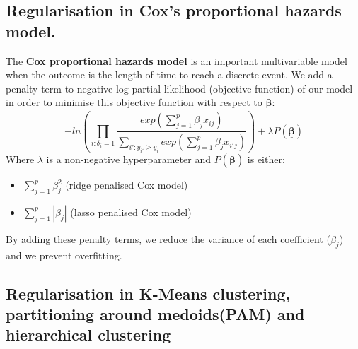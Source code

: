 \documentclass[12pt]{article}
\begin{document}
\subsection*{Regularisation in Cox's proportional hazards model.}
The \textbf{Cox proportional hazards model} is an important multivariable model when the outcome is the length of time to reach a discrete event. We add a penalty term to negative log partial likelihood (objective function)
of our model in order to minimise this objective function with respect to $\boldsymbol{\underline{\beta}}$:
$$ -ln\left(\prod_{i:\delta_i=1}\frac{exp(\sum_{j=1}^{p}\beta_j x_{ij})}{\sum_{i':y_{i'}\geq y_i}exp(\sum_{j=1}^{p} \beta_j x_{i'j})}\right) + \lambda P(\boldsymbol{\underline{\beta}})$$
Where $\lambda$ is a non-negative hyperparameter and $P(\boldsymbol{\underline{\beta}})$ is either:
\begin{itemize}
    \item $\sum_{j=1}^{p}\beta_{j}^2$ (ridge penalised Cox model)
    \item $\sum_{j=1}^{p}|\beta_j|$ (lasso penalised Cox model)
\end{itemize}
By adding these penalty terms, we reduce the variance of each coefficient ($\beta_j$) and we prevent overfitting.

\newpage
\subsection*{Regularisation in K-Means clustering, partitioning around medoids(PAM) and hierarchical clustering}
\end{document}
